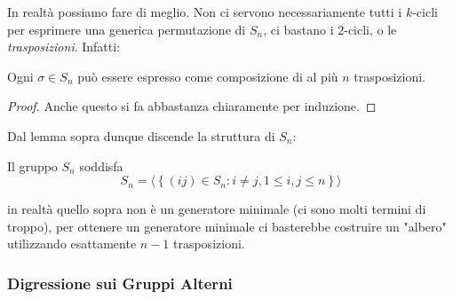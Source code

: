 \documentclass[11pt]{scrartcl}
\begin{document}
	In realtà possiamo fare di meglio. Non ci servono necessariamente tutti i $k$-cicli per esprimere una generica permutazione di $S_n$, ci bastano i $2$-cicli, o le \textit{trasposizioni}. Infatti:
	\begin{proposition}
		Ogni $\sigma\in S_n$ può essere espresso come composizione di al più $n$ trasposizioni.
	\end{proposition} 
	\begin{proof}
		Anche questo si fa abbastanza chiaramente per induzione.
	\end{proof}
	Dal lemma sopra dunque discende la struttura di $S_n$:
	\begin{corollary}[Struttura di $S_n$]
		Il gruppo $S_n$ soddisfa
		$$S_n=\langle \left\{(ij)\in S_n:i\ne j, 1\le i,j\le n\right\}\rangle$$
	\end{corollary}
	in realtà quello sopra non è un generatore minimale (ci sono molti termini di troppo), per ottenere un generatore minimale ci basterebbe costruire un "albero" utilizzando esattamente $n-1$ trasposizioni.
	\subsubsection{Digressione sui Gruppi Alterni}
	
\end{document}
